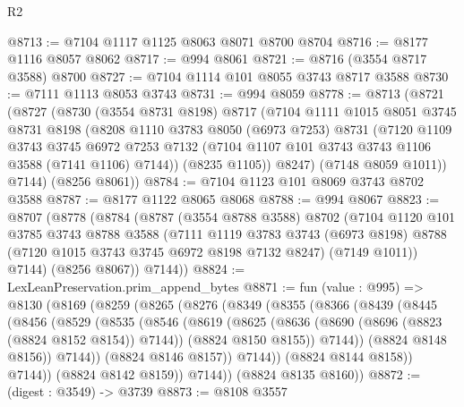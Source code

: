 \begin{lexlean}{R2}
\begin{coremodule}
@8713 := @7104 @1117 @1125 @8063 @8071 @8700 @8704
@8716 := @8177 @1116 @8057 @8062
@8717 := @994 @8061
@8721 := @8716 (@3554 @8717 @3588) @8700
@8727 := @7104 @1114 @101 @8055 @3743 @8717 @3588
@8730 := @7111 @1113 @8053 @3743
@8731 := @994 @8059
@8778 := @8713
    (@8721
      (@8727
        (@8730
          (@3554 @8731 @8198)
          @8717
          (@7104
            @1111
            @1015
            @8051
            @3745
            @8731
            @8198
            (@8208
              @1110
              @3783
              @8050
              (@6973 @7253)
              @8731
              (@7120
                @1109
                @3743
                @3745
                @6972
                @7253
                @7132
                (@7104 @1107 @101 @3743 @3743 @1106 @3588 (@7141 @1106) @7144))
              (@8235 @1105))
            @8247)
          (@7148 @8059 @1011))
        @7144)
      (@8256 @8061))
@8784 := @7104 @1123 @101 @8069 @3743 @8702 @3588
@8787 := @8177 @1122 @8065 @8068
@8788 := @994 @8067
@8823 := @8707
    (@8778
      (@8784
        (@8787
          (@3554 @8788 @3588)
          @8702
          (@7104
            @1120
            @101
            @3785
            @3743
            @8788
            @3588
            (@7111
              @1119
              @3783
              @3743
              (@6973 @8198)
              @8788
              (@7120 @1015 @3743 @3745 @6972 @8198 @7132 @8247)
              (@7149 @1011))
            @7144)
          (@8256 @8067))
        @7144))
@8824 := LexLeanPreservation.prim_append_bytes
@8871 := fun (value : @995) =>
  @8130
    (@8169
      (@8259
        (@8265
          (@8276
            (@8349
              (@8355
                (@8366
                  (@8439
                    (@8445
                      (@8456
                        (@8529
                          (@8535
                            (@8546
                              (@8619
                                (@8625
                                  (@8636
                                    (@8690 (@8696 (@8823 (@8824 @8152 @8154)) @7144))
                                    (@8824 @8150 @8155))
                                  @7144))
                              (@8824 @8148 @8156))
                            @7144))
                        (@8824 @8146 @8157))
                      @7144))
                  (@8824 @8144 @8158))
                @7144))
            (@8824 @8142 @8159))
          @7144))
      (@8824 @8135 @8160))
@8872 := (digest : @3549) -> @3739
@8873 := @8108 @3557

\end{coremodule}
\end{lexlean}
